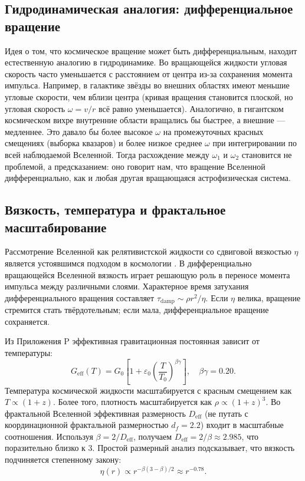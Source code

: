 \documentclass[11pt,a4paper]{article}
\begin{document}
	\subsection{Гидродинамическая аналогия: дифференциальное вращение}
	
	Идея о том, что космическое вращение может быть дифференциальным, находит естественную аналогию в гидродинамике. Во вращающейся жидкости угловая скорость часто уменьшается с расстоянием от центра из-за сохранения момента импульса. Например, в галактике звёзды во внешних областях имеют меньшие угловые скорости, чем вблизи центра (кривая вращения становится плоской, но угловая скорость \(\omega = v/r\) всё равно уменьшается). Аналогично, в гигантском космическом вихре внутренние области вращались бы быстрее, а внешние — медленнее. Это давало бы более высокое \(\omega\) на промежуточных красных смещениях (выборка квазаров) и более низкое среднее \(\omega\) при интегрировании по всей наблюдаемой Вселенной. Тогда расхождение между \(\omega_1\) и \(\omega_2\) становится не проблемой, а предсказанием: оно говорит нам, что вращение Вселенной дифференциально, как и любая другая вращающаяся астрофизическая система.
	
	\subsection{Вязкость, температура и фрактальное масштабирование}
	
	Рассмотрение Вселенной как релятивистской жидкости со сдвиговой вязкостью \(\eta\) является устоявшимся подходом в космологии \cite{Giovannini2005}. В дифференциально вращающейся Вселенной вязкость играет решающую роль в переносе момента импульса между различными слоями. Характерное время затухания дифференциального вращения составляет \(\tau_{\mathrm{damp}} \sim \rho r^2 / \eta\). Если \(\eta\) велика, вращение стремится стать твёрдотельным; если мала, дифференциальное вращение сохраняется.
	
	Из Приложения P эффективная гравитационная постоянная зависит от температуры:
	\begin{equation}
		G_{\mathrm{eff}}(T) = G_0\left[1 + \varepsilon_0\left(\frac{T}{T_0}\right)^{\beta\gamma}\right], \quad \beta\gamma = 0.20.
	\end{equation}
	Температура космической жидкости масштабируется с красным смещением как \(T \propto (1+z)\). Более того, плотность масштабируется как \(\rho \propto (1+z)^3\). Во фрактальной Вселенной эффективная размерность \(D_{\mathrm{eff}}\) (не путать с координационной фрактальной размерностью \(d_f = 2.2\)) входит в масштабные соотношения. Используя \(\beta = 2/D_{\mathrm{eff}}\), получаем \(D_{\mathrm{eff}} = 2/\beta \approx 2.985\), что поразительно близко к 3. Простой размерный анализ подсказывает, что вязкость подчиняется степенному закону:
	\begin{equation}
		\eta(r) \propto r^{-\beta(3-\beta)/2} \approx r^{-0.78}.
	\end{equation}
	
\end{document}
